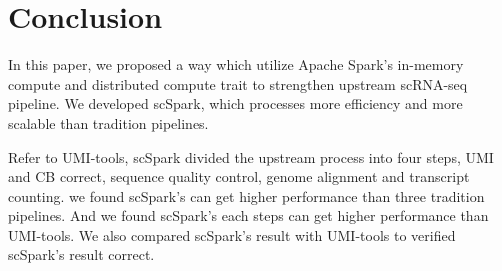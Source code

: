 \documentclass[conference]{IEEEtran}
\begin{document}
\section{Conclusion}
In this paper, we proposed a way which utilize Apache Spark's in-memory compute and distributed compute trait to strengthen upstream scRNA-seq pipeline.
We developed scSpark, which processes more efficiency and more scalable than tradition pipelines.

Refer to UMI-tools, scSpark divided the upstream process into four steps, UMI and CB correct, sequence quality control, genome alignment and transcript counting.
we found scSpark's can get higher performance than three tradition pipelines.
And we found scSpark's each steps can get higher performance than UMI-tools.
We also compared scSpark's result with UMI-tools to verified scSpark's result correct.



\end{document}
